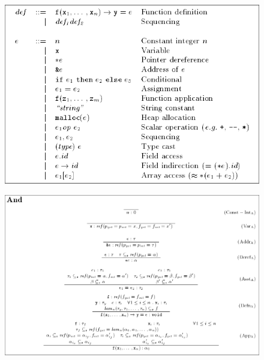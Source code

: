 \documentclass{beamer}
\begin{document}
\begin{frame}
  \begin{figure}
    \centering
    \includegraphics[scale=0.3]{language_syntax.png}
  \end{figure}
\end{frame}

\begin{frame}
  \begin{figure}
    \centering
    \includegraphics[scale=0.3]{andersen_inference_rules.png}
  \end{figure}
\end{frame}
\end{document}
